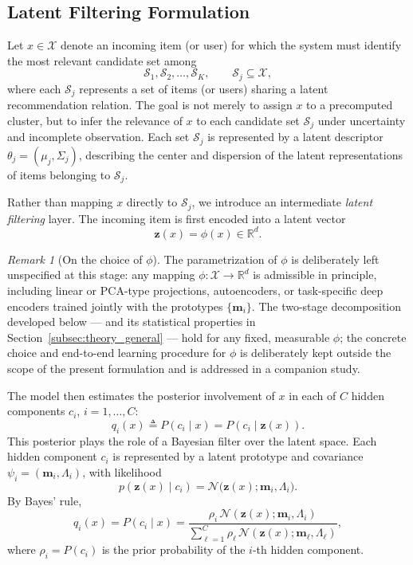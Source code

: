 \documentclass{article}
\theoremstyle{plain}
\theoremstyle{definition}
\theoremstyle{remark}
\newtheorem{remark}{Remark}
\begin{document}
\subsection{Latent Filtering Formulation}
\label{subsec:latent_filtering}

Let $x \in \mathcal{X}$ denote an incoming item (or user) for which the system must identify the most relevant candidate set among
\[
\mathcal{S}_1, \mathcal{S}_2, \ldots, \mathcal{S}_K, \qquad \mathcal{S}_j \subseteq \mathcal{X},
\]
where each $\mathcal{S}_j$ represents a set of items (or users) sharing a latent recommendation relation. The goal is not merely to assign $x$ to a precomputed cluster, but to infer the relevance of $x$ to each candidate set $\mathcal{S}_j$ under uncertainty and incomplete observation. Each set $\mathcal{S}_j$ is represented by a latent descriptor $\theta_j = (\mu_j, \Sigma_j)$, describing the center and dispersion of the latent representations of items belonging to $\mathcal{S}_j$.

Rather than mapping $x$ directly to $\mathcal{S}_j$, we introduce an intermediate \emph{latent filtering} layer. The incoming item is first encoded into a latent vector
\[
\mathbf{z}(x) = \phi(x) \in \mathbb{R}^d.
\]

\begin{remark}[On the choice of $\phi$]
	\label{rem:phi_choice}
	The parametrization of $\phi$ is deliberately left unspecified at this stage: any mapping $\phi:\mathcal X\to\mathbb R^d$ is admissible in principle, including linear or PCA-type projections, autoencoders, or task-specific deep encoders trained jointly with the prototypes $\{\mathbf m_i\}$. The two-stage decomposition developed below — and its statistical properties in Section~\ref{subsec:theory_general} — hold for any fixed, measurable $\phi$; the concrete choice and end-to-end learning procedure for $\phi$ is deliberately kept outside the scope of the present formulation and is addressed in a companion study.
\end{remark}

The model then estimates the posterior involvement of $x$ in each of $C$ hidden components $c_i$, $i = 1, \ldots, C$:
\[
q_i(x) \triangleq P(c_i \mid x) = P(c_i \mid \mathbf{z}(x)).
\]
This posterior plays the role of a Bayesian filter over the latent space. Each hidden component $c_i$ is represented by a latent prototype and covariance $\psi_i = (\mathbf{m}_i, \Lambda_i)$, with likelihood
\[
p(\mathbf{z}(x) \mid c_i) = \mathcal{N}\big(\mathbf{z}(x); \mathbf{m}_i, \Lambda_i\big).
\]
By Bayes' rule,
\begin{equation}
	\label{eq:posterior_component}
	q_i(x) = P(c_i \mid x) = \frac{\rho_i \, \mathcal{N}(\mathbf{z}(x); \mathbf{m}_i, \Lambda_i)}{\sum_{\ell=1}^{C} \rho_\ell \, \mathcal{N}(\mathbf{z}(x); \mathbf{m}_\ell, \Lambda_\ell)},
\end{equation}
where $\rho_i = P(c_i)$ is the prior probability of the $i$-th hidden component.
\end{document}
